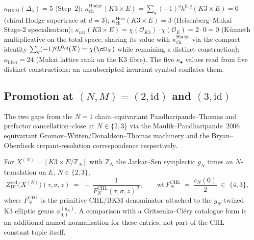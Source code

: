 \begin{remark}[Five-invariant separation at \texorpdfstring{$N = 1$}{N = 1}]
\label{rem:k3e-lorgat-conj1-N1-kappa}
$\kappa_{\mathrm{BKM}}(\Delta_5) = 5$ (Step~$2$); $\kappa_{\mathrm{ch}}^{\mathrm{Hodge}}(K3 \times E) = \sum_q (-1)^q h^{0, q}(K3 \times E) = 0$ (chiral Hodge supertrace at $d = 3$); $\kappa_{\mathrm{ch}}^{\mathrm{Heis}}(K3 \times E) = 3$ (Heisenberg--Mukai Stage-$2$ specialisation); $\kappa_{\mathrm{cat}}(K3 \times E) = \chi(\mathcal{O}_{K3}) \cdot \chi(\mathcal{O}_E) = 2 \cdot 0 = 0$ (K\"unneth multiplicative on the total space, sharing its value with $\kappa_{\mathrm{ch}}^{\mathrm{Hodge}}$ via the compact identity $\sum_q (-1)^q h^{0, q}(X) = \chi(\cO_X)$ while remaining a distinct construction); $\kappa_{\mathrm{fiber}} = 24$ (Mukai lattice rank on the K3 fibre). The five $\kappa_\bullet$ values read from five distinct constructions; an unsubscripted invariant symbol conflates them.
\end{remark}

\subsection{Promotion at \texorpdfstring{$(N, M) = (2, \mathrm{id})$}{(N, M) = (2, id)} and \texorpdfstring{$(3, \mathrm{id})$}{(3, id)}}
\label{subsec:k3e-lorgat-conj1-N23}

The two gaps from the $N = 1$ chain--equivariant Pandharipande--Thomas and prefactor cancellation--close at $N \in \{2, 3\}$ via the Maulik--Pandharipande~$2006$ equivariant Gromov--Witten/Donaldson--Thomas machinery and the Bryan--Oberdieck crepant-resolution correspondence respectively.

\begin{theorem}
\label{thm:oberdieck-chl-N-2-3}
For $X^{(N)} = [K3 \times E / \mathbb{Z}_N]$ with $\mathbb{Z}_N$ the Jatkar--Sen symplectic $g_N$ times an $N$-translation on $E$, $N \in \{2, 3\}$,
\[
Z^{\mathrm{red}}_{\mathrm{DT}}\bigl(X^{(N)}\bigr)(\tau, \sigma, z) \;=\; -\,\frac{1}{F^{\mathrm{CHL}}_N(\tau, \sigma, z)^{\,2}}, \qquad \mathrm{wt}\,F^{\mathrm{CHL}}_N \;=\; \frac{c_N(0)}{2} \;\in\; \{4, 3\},
\]
where $F^{\mathrm{CHL}}_N$ is the primitive CHL/BKM denominator attached to the $g_N$-twined K3 elliptic genus $\phi^{(g_N)}_{0, 1}$. A comparison with a Gritsenko--Cl\'ery catalogue form is an additional named normalisation for these entries, not part of the CHL constant tuple itself.
\end{theorem}

